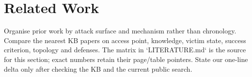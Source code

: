 \section{Related Work}
Organise prior work by attack surface and mechanism rather than chronology. Compare the nearest KB papers on
access point, knowledge, victim state, success criterion, topology and defenses. The matrix in `LITERATURE.md` is
the source for this section; exact numbers retain their page/table pointers. State our one-line delta only after
checking the KB and the current public search.
